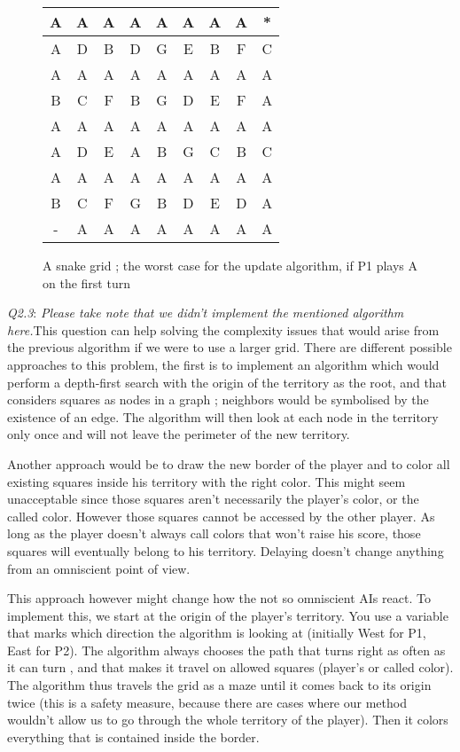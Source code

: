\documentclass[a4paper]{article}
\begin{document}
\begin{figure}[]
\begin{center}
\begin{tabular}{|c|c|c|c|c|c|c|c|c|}
\hline
	A & A & A & A & A & A & A & A & * \\
\hline
	A & D & B & D & G & E & B & F & C \\
\hline
	A & A & A & A & A & A & A & A & A \\
\hline
	B & C & F & B & G & D & E & F & A \\
\hline
	A & A & A & A & A & A & A & A & A \\
\hline
	A & D & E & A & B & G & C & B & C \\
\hline
	A & A & A & A & A & A & A & A & A \\
\hline
	B & C & F & G & B & D & E & D & A \\
\hline
	- & A & A & A & A & A & A & A & A \\
\hline
\end{tabular}
\end{center}
\caption{A snake grid ; the worst case for the update algorithm, if P1 plays A on the first turn}
\end{figure}


\emph{Q2.3}: \textit{Please take note that we didn't implement the mentioned algorithm here.}\newline This question can help solving the complexity issues that would
arise from the previous algorithm if we were to use a larger grid.
There are different possible approaches to this problem, the first is to implement an algorithm which would perform a depth-first search with the origin of the territory as the root, and that considers squares as nodes in a graph ; neighbors would be symbolised by the existence of an edge.
The algorithm will then look at each node in the territory only once and
will not leave the perimeter of the new territory.\newline

Another approach would be to draw the new border of the player and to color
all existing squares inside his territory with the right color.
This might seem unacceptable since those squares aren't necessarily the
player's color, or the called color.
 However those squares cannot be accessed by the other player. As long as
the player doesn't always call colors that won't raise his score, those squares will eventually belong to his territory. Delaying doesn't change anything from an omniscient point of view.

This approach however might change how the not so omniscient AIs react.
To implement this, we start at the origin of the player's territory. You use
a variable that marks which direction the algorithm is looking at
(initially West for P1, East for P2).
The algorithm always chooses the path that turns right as often as it can turn , and that makes it travel on allowed squares (player's or called color).
The algorithm thus travels the grid as a maze until it comes back to its
origin twice (this is a safety measure, because there are cases where our method wouldn't allow us to go through the whole territory of the player). Then it colors everything that is contained inside the border.
\end{document}
